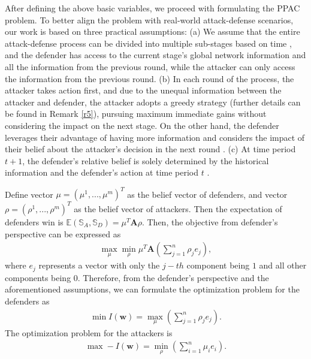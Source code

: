 \documentclass[lettersize,journal]{IEEEtran}
\begin{document}
 After defining the above basic variables, we proceed with formulating the PPAC problem. To better align the problem with real-world attack-defense scenarios, our work is based on three practical assumptions: (a) We assume that the entire attack-defense process can be divided into multiple sub-stages based on time \cite{wrightson2014advanced}, and the defender has access to the current stage's global network information and all the information from the previous round, while the attacker can only access the information from the previous round. (b) In each round of the process, the attacker takes action first, and due to the unequal information between the attacker and defender, the attacker adopts a greedy strategy (further details can be found in Remark \ref{r5}), pursuing maximum immediate gains without considering the impact on the next stage. On the other hand, the defender leverages their advantage of having more information and considers the impact of their belief about the attacker's decision in the next round \cite{dawkins2004systematic}. (c) At time period $t+1$, the defender's relative belief is solely determined by the historical information and the defender's action at time period $t$ \cite{fudenberg1991game}. 
\par
Define vector $\mu = (\mu^1,...,\mu^m)^T$ as the belief vector of defenders, and vector $\rho = (\rho^1,...,\rho^m)^T$ as the belief vector of attackers. Then the expectation of defenders win is $\mathbb{E}(\mathbb{S}_A,\mathbb{S}_D)=\mu^T \mathbf{A} \rho$. Then, the objective from defender's perspective can be expressed as 
\begin{equation}
\begin{aligned}
 \max_{\mu} \min_{\rho}\mu^T \mathbf{A} (\sum^n_{j=1}\rho_je_j),
   \end{aligned}
\end{equation}
where $e_j$ represents a vector with only the $j-th$ component being $1$ and all other components being $0$. Therefore, from the defender's perspective and the aforementioned assumptions, we can formulate the optimization problem for the defenders as 
\begin{equation}
\begin{aligned}
 \min I(\bm{w})= \max_{\mu}(\sum^n_{j=1}\rho_je_j).
\end{aligned}
\end{equation}
The optimization problem for the attackers is 
\begin{equation}
\begin{aligned}
 \max -I(\bm{w})= \min_{\rho}(\sum^n_{i=1}\mu_ie_i).
\end{aligned}
\end{equation}
\end{document}
